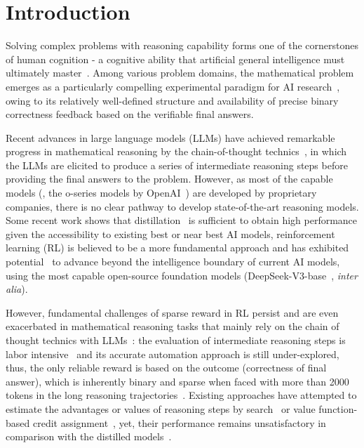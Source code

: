 
\section{Introduction}
\label{sec: intro}

Solving complex problems with reasoning capability forms one of the cornerstones of human cognition - a cognitive ability that artificial general intelligence must ultimately master~\cite{xu2025towards, zhong2024evaluation}. Among various problem domains, the mathematical problem emerges as a particularly compelling experimental paradigm for AI research~\cite{liu2023mathematical, matzakos2023learning, ying2024internlm, shao2024deepseekmath}, owing to its relatively well-defined structure and availability of precise binary correctness feedback based on the verifiable final answers.

Recent advances in large language models (LLMs) have achieved remarkable progress in mathematical reasoning by the chain-of-thought technics~\cite{wei2022chain, wang2022self, kojima2022large}, 
in which the LLMs are elicited to produce a series of intermediate reasoning steps before providing the final answers to the problem.
However, as most of the capable models (\eg, the o-series models by OpenAI~\cite{openai2024learning}) are developed by proprietary companies, there is no clear pathway to develop state-of-the-art reasoning models. Some recent work shows that distillation~\cite{huang2024o1, Slow_Thinking_with_LLMs_2} is sufficient to obtain high performance given the accessibility to existing best or near best AI models, reinforcement learning (RL) is believed to be a more fundamental approach and has exhibited potential~\cite{deepseekr1} to advance beyond the intelligence boundary of current AI models, using the most capable open-source foundation models (DeepSeek-V3-base~\cite{liu2024deepseek}, \textit{inter alia}).

However, fundamental challenges of sparse reward in RL persist and are even exacerbated in mathematical reasoning tasks that mainly rely on the chain of thought technics with LLMs~\cite{wei2022chain}: the evaluation of intermediate reasoning steps is labor intensive~\cite{lightman2023let} and its accurate automation approach is still under-explored, thus, the only reliable reward is based on the outcome (correctness of final answer), which is inherently binary and sparse when faced with more than 2000 tokens in the long reasoning trajectories~\cite{deepseekr1, team2025kimi}. Existing approaches have attempted to estimate the advantages or values of reasoning steps by search~\cite{wang2024math, kazemnejad2024vineppo} or value function-based credit assignment~\cite{schulman2017proximal, cui2025process}, yet, their performance remains unsatisfactory in comparison with the distilled models~\cite{deepseekr1}.

